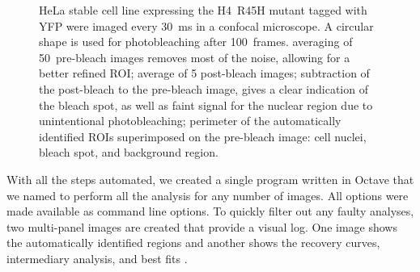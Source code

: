 \begin{figure}
  \centering
  \hfill
  \hfill
               {HeLa stable cell line expressing the H4~R45H mutant
                 tagged with YFP were imaged every \SI{30}{\ms} in a
                 confocal microscope. A circular shape is used for
                 photobleaching after 100~frames.
                 averaging of 50~pre-bleach images removes most of the
                 noise, allowing for a better refined ROI;
                 average of 5 post-bleach images;
                 subtraction of the post-bleach to the pre-bleach
                 image, gives a clear indication of the bleach spot,
                 as well as faint signal for the nuclear region due to
                 unintentional photobleaching;
                 perimeter of the automatically identified ROIs
                 superimposed on the pre-bleach image: cell nuclei,
                 bleach spot, and background region.  }
               \label{fig:software:frap-roi}
\end{figure}


With all the steps automated, we created a single program written in Octave
that we named  to perform all the
analysis for any number of images.  All options were made
available as command line options.
To quickly filter out any faulty analyses, two multi-panel
images are created that provide a visual log.  One image shows the
automatically identified regions  and
another shows the recovery curves, intermediary analysis, and best fits
.


